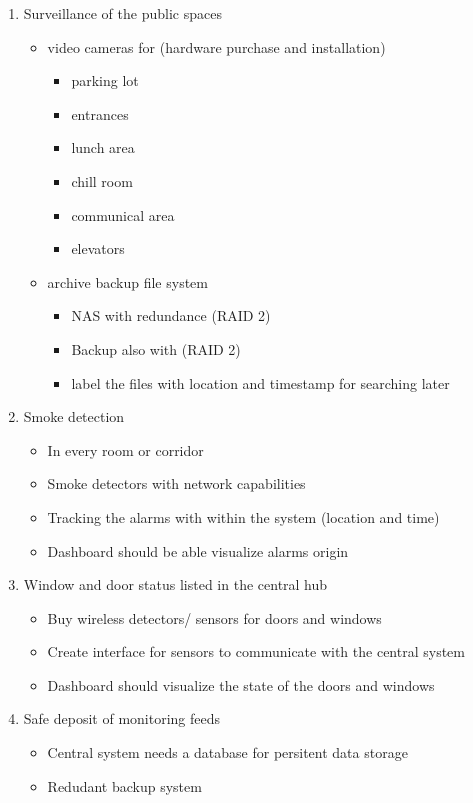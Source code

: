 \begin{enumerate}
\item Surveillance of the public spaces
\label{sec:org073d37f}
\begin{itemize}
\item video cameras for (hardware purchase and installation)
\begin{itemize}
\item parking lot
\item entrances
\item lunch area
\item chill room
\item communical area
\item elevators
\end{itemize}
\item archive backup file system
\begin{itemize}
\item NAS with redundance (RAID 2)
\item Backup also with (RAID 2)
\item label the files with location and timestamp for searching later
\end{itemize}
\end{itemize}
\item Smoke detection
\label{sec:orgd44eac6}
\begin{itemize}
\item In every room or corridor
\item Smoke detectors with network capabilities
\item Tracking the alarms with within the system (location and time)
\item Dashboard should be able visualize alarms origin
\end{itemize}

\item Window and door status listed in the central hub
\label{sec:org4d440ca}
\begin{itemize}
\item Buy wireless detectors/ sensors for doors and windows
\item Create interface for sensors to communicate with the central system
\item Dashboard should visualize the state of the doors and windows
\end{itemize}
\item Safe deposit of monitoring feeds
\label{sec:orgc8e70b4}
\begin{itemize}
\item Central system needs a database for persitent data storage
\item Redudant backup system
\end{itemize}
\end{enumerate}

